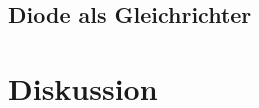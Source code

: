 \documentclass[12pt,a4paper,twopage]{article}
\begin{document}




\subsection{Diode als Gleichrichter}

\section{Diskussion}															
\end{document}
